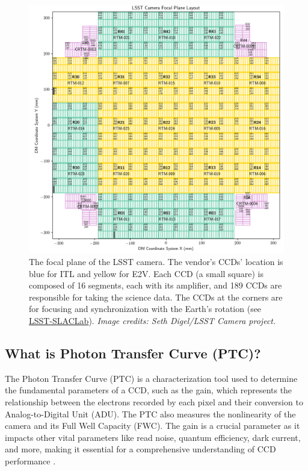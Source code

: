 \begin{figure}[!htb]
    \centering
    \includegraphics[width=\textwidth]{Figures/FP_layout_DM.png}
    \caption{The focal plane of the LSST camera. The vendor's CCDs' location is blue for ITL and yellow for E2V. Each CCD (a small square) is composed of 16 segments, each with its amplifier, and 189 CCDs are responsible for taking the science data. The CCDs at the corners are for focusing and synchronization with the Earth's rotation (see \href{https://www6.slac.stanford.edu/news/2020-09-08-sensors-world-largest-digital-camera-snap-first-3200-megapixel-images-slac.aspx}{LSST-SLACLab}). \textit{Image credits: Seth Digel/LSST Camera project.}}
    \label{fig:FP_LSSTCam}
\end{figure}

\subsection{What is Photon Transfer Curve (PTC)?}
The Photon Transfer Curve (PTC) is a characterization tool used to determine the fundamental parameters of a CCD, such as the gain, which represents the relationship between the electrons recorded by each pixel and their conversion to Analog-to-Digital Unit (ADU). The PTC also measures the nonlinearity of the camera and its Full Well Capacity (FWC). The gain is a crucial parameter as it impacts other vital parameters like read noise, quantum efficiency, dark current, and more, making it essential for a comprehensive understanding of CCD performance \citep{downing2006ccd}.

